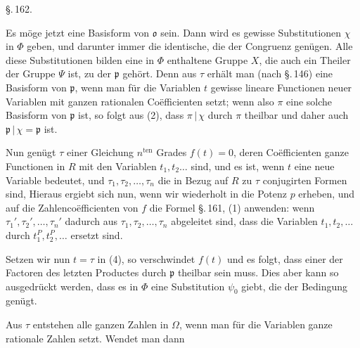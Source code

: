 \begin{center}
\S.\,162.\\[4pt]
\end{center}

Es möge jetzt
eine Basisform von $\mathfrak{o}$ sein. Dann wird es gewisse Substitutionen $\chi$ in $\Phi$ geben, und darunter immer die identische, die der Congruenz
genügen. Alle diese Substitutionen bilden eine in $\Phi$ enthaltene Gruppe $X$, die auch ein Theiler der Gruppe $\Psi$ ist, zu der $\mathfrak{p}$ gehört. Denn aus $\tau$ erhält man (nach \S.\,146) eine Basisform von $\mathfrak{p}$, wenn man für die Variablen $t$ gewisse lineare Functionen neuer Variablen mit ganzen rationalen Coëfficienten setzt; wenn also $\pi$ eine solche Basisform von $\mathfrak{p}$ ist, so folgt aus (2), dass $\pi \,|\, \chi$ durch $\pi$ theilbar und daher auch $\mathfrak{p} \,|\, \chi = \mathfrak{p}$ ist.

Nun genügt $\tau$ einer Gleichung $n^{\text{ten}}$ Grades $f(t) = 0$, deren Coëfficienten ganze Functionen in $R$ mit den Variablen $t_1, t_2 \ldots$ sind, und es ist, wenn $t$ eine neue Variable bedeutet, und $\tau_1, \tau_2, \ldots, \tau_n$ die in Bezug auf $R$ zu $\tau$ conjugirten Formen sind,
Hieraus ergiebt sich nun, wenn wir wiederholt in die Potenz $p$ erheben, und auf die Zahlencoëfficienten von $f$ die Formel \S.\,161, (1) anwenden:
wenn $\tau_1', \tau_2', \ldots, \tau_n'$ dadurch aus $\tau_1, \tau_2, \ldots, \tau_n$ abgeleitet sind, dass die Variablen $t_1, t_2, \ldots$ durch $t_1^P, t_2^P, \ldots$ ersetzt sind.

Setzen wir nun $t = \tau$ in (4), so verschwindet $f(t)$ und es folgt, dass einer der Factoren des letzten Productes durch $\mathfrak{p}$ theilbar sein muss. Dies aber kann so ausgedrückt werden, dass es in $\Phi$ eine Substitution $\psi_0$ giebt, die der Bedingung
genügt.

Aus $\tau$ entstehen alle ganzen Zahlen in $\Omega$, wenn man für die Variablen ganze rationale Zahlen setzt. Wendet man dann
